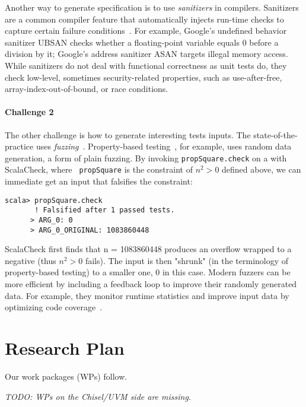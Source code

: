 \documentclass[fleqn,12pt]{article}
\newcommand{\todo}[1]{{\it TODO: #1}}
\begin{document}
Another way to generate specification is to use \emph{sanitizers} in
compilers. Sanitizers are a common compiler feature that automatically
injects run-time checks to capture certain failure
conditions~\cite{DBLP:conf/usenix/SerebryanyBPV12}. For example,
Google's undefined behavior sanitizer UBSAN checks whether a
floating-point variable equals 0 before a division by it; Google's
address sanitizer ASAN targets illegal memory access. While sanitizers
do not deal with functional correctness as unit tests do, they check
low-level, sometimes security-related properties, such as
use-after-free, array-index-out-of-bound, or race conditions.

\paragraph{Challenge 2}
The other challenge is how to generate interesting tests inputs.  The
state-of-the-practice  uses
\emph{fuzzing}~\cite{takanen2018fuzzing}. Property-based testing~\cite{DBLP:conf/icfp/ClaessenH00},
for example, uses random data generation, a form of plain fuzzing.  By
invoking {\tt propSquare.check} on a with ScalaCheck, where {\tt
  propSquare} is the constraint of $n^2>0$ defined above, we can
immediate get an input that falsifies the constraint:

\begin{lstlisting}[numbers=none]
scala> propSquare.check
       ! Falsified after 1 passed tests.
      > ARG_0: 0
      > ARG_0_ORIGINAL: 1083860448
\end{lstlisting}
 ScalaCheck first finds that n = 1083860448 produces an overflow
 wrapped to a negative (thus $n^2>0$ fails). The input is then
 "shrunk" (in the terminology of property-based testing) to a smaller
 one, 0 in this case.  Modern fuzzers can be more efficient by
 including a feedback loop to improve their randomly generated
 data. For example, they monitor runtime statistics and improve input
 data by optimizing code
 coverage~\cite{DBLP:journals/tse/BohmePR19,DBLP:conf/pldi/FuS17}.






\section{Research Plan}


Our work packages (WPs) follow.

\todo{WPs on the Chisel/UVM side are missing.}
\end{document}
